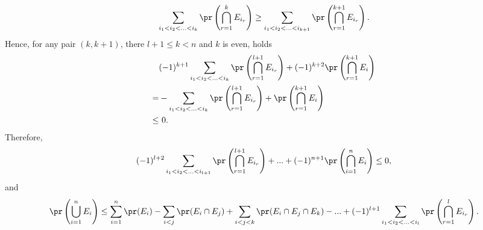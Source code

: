 \begin{enumerate}
  \[
    \sum_{i_1<i_2< ... <i_k} \pr\left(\bigcap_{r=1}^k E_{i_r}\right)
    \geq \sum_{i_1<i_2< ... <i_{k+1}} \pr\left(\bigcap_{r=1}^{k+1} E_{i_r}\right).
  \]
  Hence, for any pair $(k,k+1)$, there $l+1 \leq k < n$ and $k$ is even, holds
  \begin{align*}
    \   &(-1)^{k+1} \sum_{i_1<i_2< ... <i_{k}} \pr\left(\bigcap_{r=1}^{l+1} E_{i_r}\right) + (-1)^{k+2} \pr\left( \bigcap_{r=1}^{k+1} E_{i} \right) \\
    =   &-\sum_{i_1<i_2< ... <i_k} \pr\left( \bigcap_{r=1}^{l+1} E_{i_r} \right) + \pr\left(\bigcap_{r=1}^{k+1} E_{i}\right) \\
    \leq &\ 0.
  \end{align*}
  Therefore,
  \[
    (-1)^{l+2} \sum_{i_1<i_2< ... <i_{l+1}} \pr\left(\bigcap_{r=1}^{l+1} E_{i_r}\right)
    + ... + (-1)^{n+1} \pr\left(\bigcap_{i=1}^n E_{i}\right) \leq 0,
  \]
  and
  \[
    \pr\left(\bigcup_{i=1}^n E_i\right)
    \leq \sum_{i=1}^n \pr(E_i) - \sum_{i<j}\pr(E_i \cap E_j) + \sum_{i<j<k}\pr(E_i \cap E_j \cap E_k) - ... + (-1)^{l+1} \sum_{i_1<i_2< ... <i_l} \pr\left(\bigcap_{r=1}^lE_{i_r}\right).
  \]


\end{enumerate}
